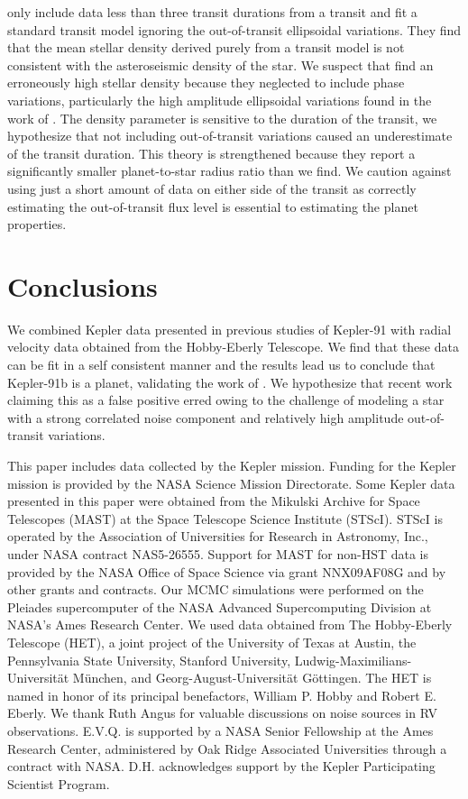 \documentclass[apjl]{emulateapj}
\begin{document}
\citet{sliski14} only include data less than three transit durations from a transit and fit a standard transit model ignoring the out-of-transit ellipsoidal variations. They find that the mean stellar density derived purely from a transit model is not consistent with the asteroseismic density of the star. We suspect that \citeauthor{sliski14} find an erroneously high stellar density because they neglected to include phase variations, particularly the high amplitude ellipsoidal variations found in the work of \citet{lillo14}. The density parameter is sensitive to the duration of the transit, we hypothesize that not including out-of-transit variations caused an underestimate of the transit duration. This theory is strengthened because they report a significantly smaller planet-to-star radius ratio than we find. We caution against using just a short amount of data on either side of the transit as correctly estimating the out-of-transit flux level is essential to estimating the planet properties.



\section{Conclusions}
We combined Kepler data presented in previous studies of Kepler-91 with radial velocity data obtained from the Hobby-Eberly Telescope. We find that these data can be fit in a self consistent manner and the results lead us to conclude that Kepler-91b is a planet, validating the work of \citet{lillo14}. We hypothesize that recent work claiming this as a false positive erred owing to the challenge of modeling a star with a strong correlated noise component and relatively high amplitude out-of-transit variations. 

\acknowledgments
This paper includes data collected by the Kepler mission. Funding for the Kepler mission is provided by the NASA Science Mission Directorate. Some Kepler data presented in this paper were obtained from the Mikulski Archive for Space Telescopes (MAST) at the Space Telescope Science Institute (STScI). STScI is operated by the Association of Universities for Research in Astronomy, Inc., under NASA contract NAS5-26555. Support for MAST for non-HST data is provided by the NASA Office of Space Science via grant NNX09AF08G and by other grants and contracts. Our MCMC simulations were performed on the Pleiades supercomputer of the NASA Advanced Supercomputing Division at NASA's Ames Research Center. We used data obtained from The Hobby-Eberly Telescope (HET), a joint project of the University of Texas at Austin, the Pennsylvania State University, Stanford University, Ludwig-Maximilians-Universit\"{a}t M\"{u}nchen, and Georg-August-Universit\"{a}t G\"{o}ttingen. The HET is named in honor of its principal benefactors, William P. Hobby and Robert E. Eberly. We thank Ruth Angus for valuable discussions on noise sources in RV observations. E.V.Q. is supported by a NASA Senior Fellowship at the Ames Research Center, administered by Oak Ridge Associated Universities through a contract with NASA. D.H. acknowledges support by the Kepler Participating Scientist Program. 






\end{document}
